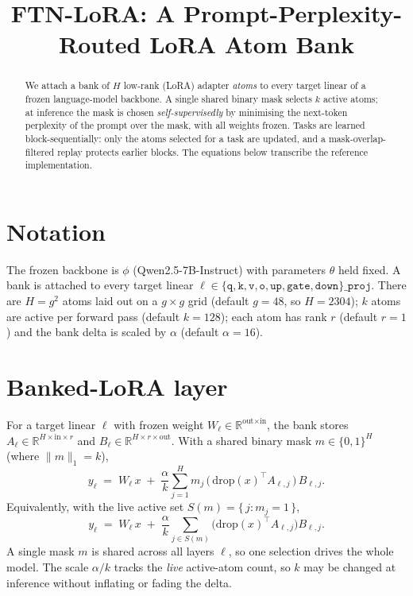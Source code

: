 \documentclass[11pt]{article}
\title{FTN-LoRA: A Prompt-Perplexity-Routed LoRA Atom Bank}
\author{}
\date{}
\newcommand{\drop}{\mathrm{drop}}
\newcommand{\RR}{\mathbb{R}}
\begin{document}
\maketitle

\begin{abstract}
We attach a bank of $H$ low-rank (LoRA) adapter \emph{atoms} to every target
linear of a frozen language-model backbone. A single shared binary mask selects
$k$ active atoms; at inference the mask is chosen \emph{self-supervisedly} by
minimising the next-token perplexity of the prompt over the mask, with all
weights frozen. Tasks are learned block-sequentially: only the atoms selected
for a task are updated, and a mask-overlap-filtered replay protects earlier
blocks. The equations below transcribe the reference implementation.
\end{abstract}

\section{Notation}
The frozen backbone is $\phi$ (Qwen2.5-7B-Instruct) with parameters $\theta$ held
fixed. A bank is attached to every target linear
$\ell \in \{\texttt{q},\texttt{k},\texttt{v},\texttt{o},\texttt{up},\texttt{gate},\texttt{down}\}\texttt{\_proj}$.
There are $H = g^2$ atoms laid out on a $g \times g$ grid (default $g = 48$, so
$H = 2304$); $k$ atoms are active per forward pass (default $k = 128$); each atom
has rank $r$ (default $r = 1$) and the bank delta is scaled by $\alpha$ (default
$\alpha = 16$).

\section{Banked-LoRA layer}
\label{sec:layer}
For a target linear $\ell$ with frozen weight $W_\ell \in \RR^{\text{out}\times\text{in}}$,
the bank stores $A_\ell \in \RR^{H\times\text{in}\times r}$ and
$B_\ell \in \RR^{H\times r\times\text{out}}$. With a shared binary mask
$m\in\{0,1\}^H$ (where $\|m\|_1 = k$),
\begin{equation}
  y_\ell \;=\; W_\ell\, x \;+\; \frac{\alpha}{k}
  \sum_{j=1}^{H} m_j \,\bigl(\,\drop(x)^{\!\top} A_{\ell,j}\,\bigr)\, B_{\ell,j}.
\end{equation}
Equivalently, with the live active set $S(m) = \{\, j : m_j = 1 \,\}$,
\begin{equation}
  y_\ell \;=\; W_\ell\, x \;+\; \frac{\alpha}{k}
  \sum_{j \in S(m)} \bigl(\drop(x)^{\!\top} A_{\ell,j}\bigr) B_{\ell,j}.
\end{equation}
A single mask $m$ is shared across all layers $\ell$, so one selection drives the
whole model. The scale $\alpha/k$ tracks the \emph{live} active-atom count, so $k$
may be changed at inference without inflating or fading the delta.
\end{document}
